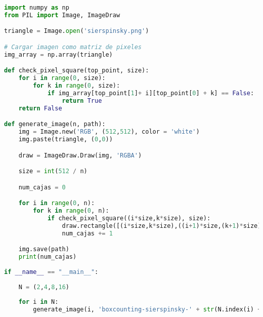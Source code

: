 \begin{lstlisting}[language=Python]
import numpy as np
from PIL import Image, ImageDraw

triangle = Image.open('sierspinsky.png')

# Cargar imagen como matriz de pixeles
img_array = np.array(triangle)

def check_pixel_square(top_point, size):
    for i in range(0, size):
        for k in range(0, size):
            if img_array[top_point[1]+ i][top_point[0] + k] == False:
                return True
    return False

def generate_image(n, path):
    img = Image.new('RGB', (512,512), color = 'white')
    img.paste(triangle, (0,0))

    draw = ImageDraw.Draw(img, 'RGBA')

    size = int(512 / n)

    num_cajas = 0

    for i in range(0, n):
        for k in range(0, n):
            if check_pixel_square((i*size,k*size), size):
                draw.rectangle([(i*size,k*size),((i+1)*size,(k+1)*size)], fill=(0,100,180,50), outline='black', width=1)
                num_cajas += 1

    img.save(path)
    print(num_cajas)
    
if __name__ == "__main__":
    
    N = (2,4,8,16)
    
    for i in N:
        generate_image(i, 'boxcounting-sierspinsky-' + str(N.index(i) + 1) + '.png')
\end{lstlisting}